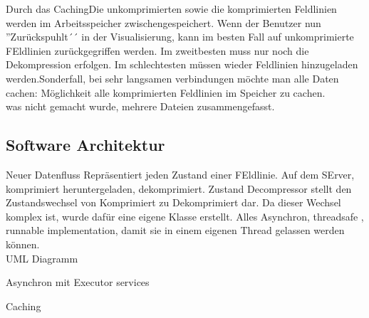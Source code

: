 Durch das CachingDie unkomprimierten sowie die komprimierten Feldlinien werden im Arbeitsspeicher zwischengespeichert. Wenn der Benutzer nun ''Zurückspuhlt´´ in der Visualisierung, kann im besten Fall auf unkomprimierte FEldlinien zurückgegriffen werden. Im zweitbesten muss nur noch die Dekompression erfolgen. Im schlechtesten müssen wieder Feldlinien hinzugeladen werden.Sonderfall, bei sehr langsamen verbindungen möchte man alle Daten cachen: Möglichkeit alle komprimierten Feldlinien im Speicher zu cachen.\\

was nicht gemacht wurde, mehrere Dateien zusammengefasst.


\subsection{Software Architektur}
Neuer Datenfluss
Repräsentiert jeden Zustand einer FEldlinie. Auf dem SErver, komprimiert heruntergeladen, dekomprimiert. Zustand Decompressor stellt den Zustandswechsel von Komprimiert zu Dekomprimiert dar. Da dieser Wechsel komplex ist, wurde dafür eine eigene Klasse erstellt. Alles Asynchron, threadsafe , runnable implementation, damit sie in einem eigenen Thread gelassen werden können.\\

UML Diagramm


Asynchron mit Executor services


Caching



